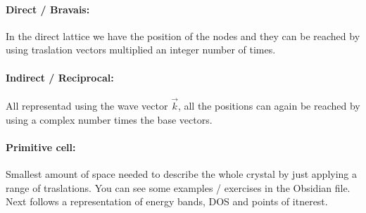 \paragraph{Direct / Bravais:} In the direct lattice we have the position of the nodes and they can be reached by using traslation vectors multiplied an integer number of times.
\paragraph{Indirect / Reciprocal:} All representad using the wave vector $\vec{k}$, all the positions can again be reached by using a complex number times the base vectors.

\paragraph{Primitive cell:} Smallest amount of space needed to describe the whole crystal by just applying a range of traslations. You can see some examples / exercises in the Obsidian file. Next follows a representation of energy bands, DOS and points of itnerest.